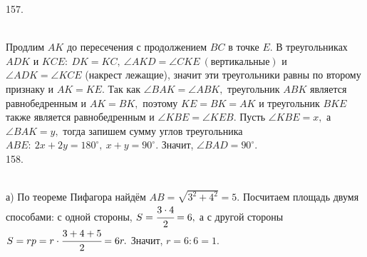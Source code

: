 \documentclass[12pt]{article}
\begin{document}
157. \begin{figure}[ht!]
\end{figure}\\
Продлим $AK$ до пересечения с продолжением $BC$ в точке $E.$  В треугольниках $ADK$ и $KCE:\ DK=KC,\ \angle AKD=\angle CKE\ (\text{вертикальные})$ и $\angle ADK=\angle KCE$ (накрест лежащие), значит эти треугольники равны по второму признаку и $AK=KE.$ Так как $\angle BAK=\angle ABK,$ треугольник $ABK$ является равнобедренным и $AK=BK,$ поэтому $KE=BK=AK$ и треугольник $BKE$ также является равнобедренным и  $\angle KBE=\angle KEB.$ Пусть $\angle KBE=x,$ а $\angle BAK=y,$ тогда запишем сумму углов треугольника $ABE:\ 2x+2y=180^\circ,\ x+y=90^\circ.$ Значит, $\angle BAD=90^\circ.$\\
158. \begin{figure}[ht!]
\end{figure}\\
а) По теореме Пифагора найдём $AB=\sqrt{3^2+4^2}=5.$ Посчитаем площадь двумя способами: с одной стороны, $S=\cfrac{3\cdot4}{2}=6,$ а с другой стороны $S=rp=r\cdot\cfrac{3+4+5}{2}=6r.$ Значит, $r=6:6=1.$\\
\end{document}

